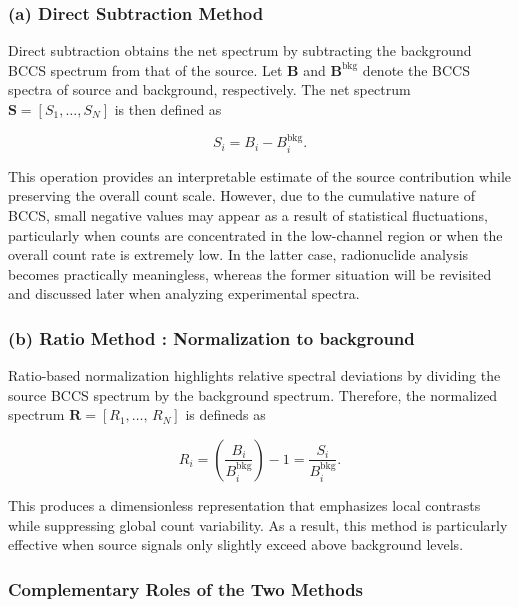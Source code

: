 \documentclass[10pt]{wlscirep}
\begin{document}
\subsubsection*{(a) Direct Subtraction Method}

Direct subtraction obtains the net spectrum by subtracting the background BCCS spectrum from that of the source. Let $\mathbf{B}$ and $\mathbf{B}^\textrm{bkg}$ denote the BCCS spectra of source and background, respectively. The net spectrum $\mathbf{S} = [S_1,\ldots,S_N]$ is then defined as

\begin{equation}
S_i =  B_i - B_i^{\textrm{bkg}}.
\end{equation}

This operation provides an interpretable estimate of the source contribution while preserving the overall count scale. However, due to the cumulative nature of BCCS, small negative values may appear as a result of statistical fluctuations, particularly when counts are concentrated in the low-channel region or when the overall count rate is extremely low. In the latter case, radionuclide analysis becomes practically meaningless, whereas the former situation will be revisited and discussed later when analyzing experimental spectra.


\subsubsection*{(b) Ratio Method : Normalization to background} 

Ratio-based normalization highlights relative spectral deviations by dividing the source BCCS spectrum by the background spectrum. Therefore, the normalized spectrum $\mathbf{R}=[R_1,\ldots,\,R_N]$ is defineds as

\begin{equation}
R_i = \left(\dfrac{B_i}{B^{\textrm{bkg}}_i}\right) -1=\dfrac{S_i}{B_i^{\text{bkg}}}.
\end{equation}

This produces a dimensionless representation that emphasizes local contrasts while suppressing global count variability. As a result, this method is particularly effective when source signals only slightly exceed above background levels.

\subsubsection*{Complementary Roles of the Two Methods} 
\end{document}
